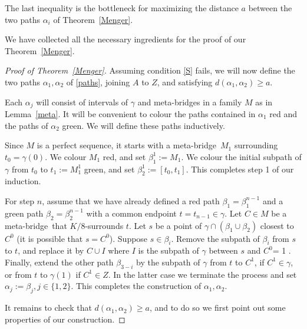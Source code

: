 \documentclass[a4paper]{article}
\newcommand{\Debug}{0}
\newcommand{\comment}[1]{}
\newtheorem{proposition}{Proposition}[section]
\newcommand{\Lr}[1]{Lemma~\ref{#1}}
\newcommand{\Tr}[1]{Theorem~\ref{#1}}
\newcommand{\st}{such that}
\newcommand{\mymargin}[1]{\ifnum \Debug = 1
  \marginpar{\begin{minipage}{\marginparwidth}\small \begin{flushleft}{\color{blue}#1}\end{flushleft}\end{minipage}}\fi
}
\newcommand{\mb}{meta-bridge}
\begin{document}
 The last inequality is the bottleneck for maximizing the distance $a$ between the two paths $\alpha_i$ of \Tr{Menger}.

\bigskip

\comment{
\begin{proposition} \label{}  
Let $x,y$ be points of meta-bridges $X,Y$ \st\ $d(x,\gamma), d(y,\gamma)\leq r$. Then $d(x,y)\geq a$ unless there are endpoints $x',y'$ of $X,Y$ \st\ $d(x',y')\leq ...$
\end{proposition}
\begin{proof}
\end{proof}
}

We have collected all the necessary ingredients for the proof of our \Tr{Menger}.

\begin{proof}[Proof of \Tr{Menger}]
Assuming condition \ref{S} fails, we will now define the two paths $\alpha _1, \alpha _2$ of \ref{paths}, joining $A$ to $Z$, and satisfying $d(\alpha _1,\alpha _2)\geq a$. \smallskip

Each $\alpha_j$ will consist of intervals of $\gamma$ and \mb s in a family $M$ as in \Lr{meta}. It will be convenient to colour the paths contained
in $\alpha _1$ red and the paths of $\alpha _2$ green. We will define these paths inductively. 

Since $M$ is a perfect sequence, it starts with a \mb\ $M_1$ surrounding $t_0=\gamma (0)$. We colour $M_1$ red, and set $\beta_1^1:= M_1$. We colour the initial subpath of $\gamma$ from $t_0$ to $t_1:= M_1^1$ green, and  set $\beta _2^1:= [t_0,t_1]$. This completes step 1 of our induction. 
 
For step $n$, assume that we have already defined a red path $\beta_1=\beta^{n-1}_1$ and a green path $\beta_2=\beta^{n-1}_2$ with a common endpoint $t= t_{n-1}\in \gamma$. Let $C\in M$ be a \mb\ that $K/8$-surrounds $t$. Let $s$ be a point of $\gamma \cap (\beta_1 \cup \beta_2)$ closest to $C^0$ (it is possible that $s=C^0$). Suppose $s\in \beta_i$. Remove the subpath of $\beta_i$ from $s$ to $t$, and replace it by $C \cup I$ where $I$ is the subpath of $\gamma$ between $s$ and $C^0$\mymargin{ (\fig{fig betas})}. Finally, extend the other path $\beta_{3-i}$ by the subpath of $\gamma$ from $t$ to $C^1$, if $C^1\in \gamma$, or from $t$ to $\gamma (1)$ if $C^1\in Z$.
In the latter case we terminate the process and set $\alpha_j:= \beta_j, j\in \{1,2\}$. This completes the construction of  $\alpha _1, \alpha _2$.

\medskip
It remains to check that $d(\alpha _1,\alpha _2)\geq a$, and to do so we first point out some properties of our construction.


\end{proof}
\end{document}
